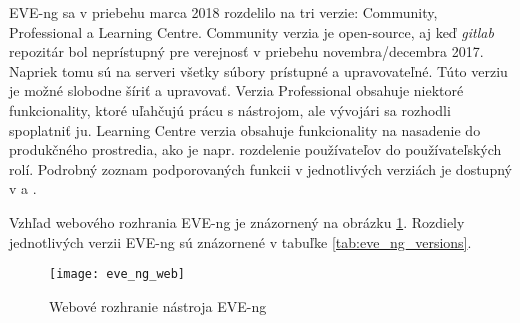EVE-ng sa v priebehu marca 2018 rozdelilo na tri verzie: Community, Professional a Learning Centre. Community verzia je open-source, aj keď \emph{gitlab} repozitár bol neprístupný pre verejnosť v priebehu novembra/decembra 2017. Napriek tomu sú na serveri všetky súbory prístupné a upravovateľné. Túto verziu je možné slobodne šíriť a upravovať. Verzia Professional obsahuje niektoré funkcionality, ktoré uľahčujú prácu s nástrojom, ale vývojári sa rozhodli spoplatniť ju. Learning Centre verzia obsahuje funkcionality na nasadenie do produkčného prostredia, ako je napr. rozdelenie používateľov do používateľských rolí. Podrobný zoznam podporovaných funkcii v jednotlivých verziách je dostupný v \cite{eve_ng_versions_table} a \cite{eve_ng_versions_list}.

Vzhľad webového rozhrania EVE-ng je znázornený na obrázku \ref{obr:eve_ng_web}. Rozdiely jednotlivých verzii EVE-ng sú znázornené v tabuľke \ref{tab:eve_ng_versions}.

\begin{figure}
    \centering
    \texttt{[image: eve\_ng\_web]}
    \caption{Webové rozhranie nástroja EVE-ng}
    \label{obr:eve_ng_web}
\end{figure}

\setcounter{table}{0}

